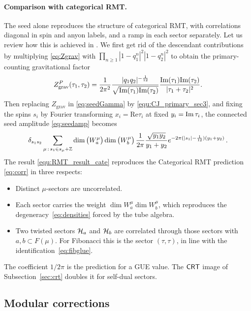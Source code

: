 \documentclass[11pt]{article}
\numberwithin{equation}{section}
\begin{document}
\paragraph{Comparison with categorical RMT.}
The seed alone reproduces the structure of categorical RMT, with correlations diagonal in spin and anyon labels, and a ramp in each sector separately. Let us review how this is achieved in \cite{Cotler:2020ugk}. We first  get rid of the descendant contributions by multiplying \eqref{eq:Zgrav} with $\prod_{n \geq 1}|1-q_1^n|^2|1-q_2^n|^2$ to obtain the primary-counting gravitational factor 
\begin{align}
 Z^P_{\rm grav}(\tau_1,\tau_2)=\frac{1}{2\pi^2}\frac{|q_1q_2|^{-\frac{1}{12}}}{\sqrt{\text{Im}(\tau_{1}) \text{Im}(\tau_2)}}\frac{\text{Im}(\tau_{1}) \text{Im}(\tau_2)}{|\tau_1+\tau_2|^2}.
 \label{equ:CJ_primary_sec3}
\end{align}
Then replacing $Z_{\mathrm{grav}}$ in \eqref{eq:seedGamma} by \eqref{equ:CJ_primary_sec3}, and fixing the spins $s_i$ by  Fourier transforming $x_i=\mathrm{Re}\tau_i$ at fixed $y_i={\rm Im}\,\tau_i$, the connected seed amplitude \eqref{eq:seedamp} becomes
\begin{align}
    \delta_{s_1s_2} \sum_{\mu\,:\,s_1\in s_\mu+\mathbb Z}  \dim\big(W_a^\mu\big)\dim\big(W_b^\mu\big)\, \frac{1}{2\pi} \frac{\sqrt{y_1 y_2}}{y_1+y_2}e^{-2\pi(|s_1|-\frac1{12})(y_1+y_2)}\,.
    \label{equ:RMT_result_cate}
\end{align}
The result \eqref{equ:RMT_result_cate} reproduces the Categorical RMT prediction \eqref{eq:corr} in three respects:

\begin{itemize}
\item Distinct $\mu$-sectors are uncorrelated.
\item Each sector carries the weight $\dim W_a^\mu\dim W_b^\mu$, which reproduces the degeneracy~\eqref{eq:densities} forced by the tube algebra.
\item Two twisted sectors $\mathcal{H}_a$ and $\mathcal{H}_b$ are correlated through those sectors with $a,b\subset F(\mu)$. For Fibonacci this is the sector $(\tau,\tau)$, in line with the identification~\eqref{eq:fibglue}.
\end{itemize}
The coefficient $1/2\pi$ is the prediction for a GUE value. The $\mathsf{CRT}$ image of Subsection~\ref{sec:crt} doubles it for self-dual sectors.


\subsection{Modular corrections}\label{sec:modular}
\end{document}
